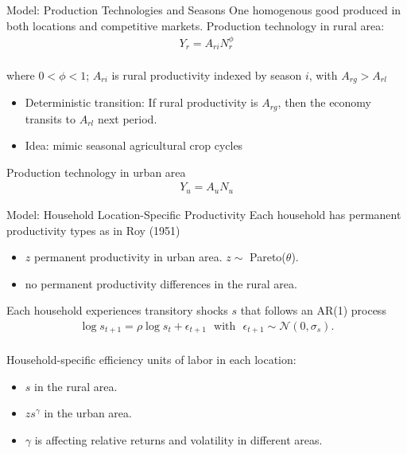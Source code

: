 \documentclass[9pt,pdftex,aspectratio=1610]{beamer}
\theoremstyle{definition}
\begin{document}
\begin{frame}[t]{Model: Production Technologies and Seasons}
One homogenous good produced in both locations and competitive markets.
\medskip
Production technology in rural area:
\begin{align*}
Y_r = A_{ri} N_r^{\phi}
\end{align*}\\
where $0<\phi<1$; $A_{ri}$ is rural productivity indexed by season $i$, with $A_{rg} > A_{rl}$ \\
\begin{itemize}
\smallskip
\item Deterministic transition: If rural productivity is $A_{rg}$, then the economy transits to $A_{rl}$ next period.
\smallskip
\item Idea: mimic seasonal agricultural crop cycles
\smallskip
\end{itemize}
\medskip
Production technology in urban area
\begin{align*}
Y_u = A_u N_u
\end{align*}
\end{frame}


\begin{frame}[t]{Model: Household Location-Specific Productivity}
Each household has permanent productivity types as in Roy (1951)
\begin{itemize}
\smallskip
\item $z$ permanent productivity in urban area. $z \sim$ Pareto($\theta$).
\smallskip
\item no permanent productivity differences in the rural area.
\end{itemize}
\bigskip
Each household experiences transitory shocks $s$ that follows an AR(1) process
\begin{align*}
\log s_{t+1} = \rho \log s_{t} + \epsilon_{t+1} \ \ \  \mbox{with} \ \  \ \epsilon_{t+1} \sim \mathcal{N}(0,\sigma_{s}).
\end{align*}\\
\bigskip
Household-specific efficiency units of labor in each location:
\begin{itemize}
\smallskip
\item $s$ in the rural area.
\smallskip
\item $zs^\gamma$ in the urban area.
\smallskip
\item $\gamma$ is affecting relative returns and volatility in different areas.
\end{itemize}
\end{frame}
\end{document}
